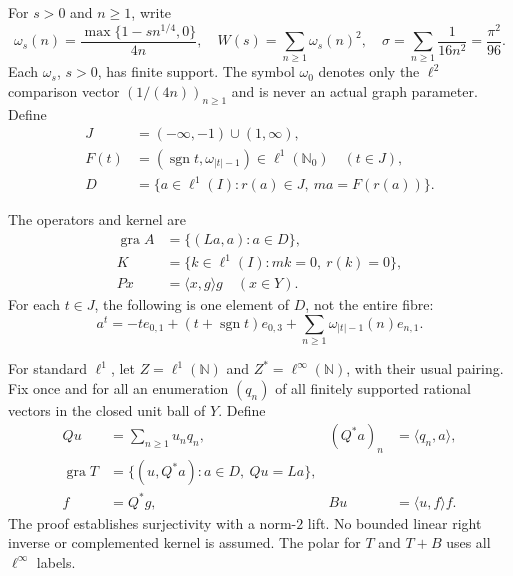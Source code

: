 \documentclass[11pt]{article}
\newcommand{\N}{\mathbb N}
\newcommand{\Nzero}{\mathbb N_0}
\newcommand{\gra}{\operatorname{gra}}
\newcommand{\sgn}{\operatorname{sgn}}
\newcommand{\pair}[2]{\langle #1,#2\rangle}
\begin{document}
For $s>0$ and $n\ge1$, write
\begin{equation}
\omega_s(n)=\frac{\max\{1-sn^{1/4},0\}}{4n},\quad
W(s)=\sum_{n\ge1}\omega_s(n)^2,\quad
\sigma=\sum_{n\ge1}\frac1{16n^2}=\frac{\pi^2}{96}.
\tag{D6}\label{eq:D6}
\end{equation}
Each $\omega_s$, $s>0$, has finite support. The symbol $\omega_0$ denotes only
the $\ell^2$ comparison vector $(1/(4n))_{n\ge1}$ and is never an actual
graph parameter. Define
\begin{equation}
\begin{aligned}
J&=(-\infty,-1)\cup(1,\infty),\\
F(t)&=(\sgn t,\omega_{|t|-1})\in\ell^1(\Nzero)\quad(t\in J),\\
D&=\{a\in\ell^1(I):r(a)\in J,\ ma=F(r(a))\}.
\end{aligned}
\tag{D7}\label{eq:D7}
\end{equation}

The operators and kernel are
\begin{equation}
\begin{aligned}
\gra A&=\{(La,a):a\in D\},\\
K&=\{k\in\ell^1(I):mk=0,\ r(k)=0\},\\
Px&=\pair{x}{g}g\quad(x\in Y).
\end{aligned}
\tag{D8}\label{eq:D8}
\end{equation}
For each $t\in J$, the following is one element of $D$, not the entire fibre:
\begin{equation}
a^t=-t e_{0,1}+(t+\sgn t)e_{0,3}
       +\sum_{n\ge1}\omega_{|t|-1}(n)e_{n,1}.
\tag{D9}\label{eq:D9}
\end{equation}

\ifdefined\expandedversion
For standard $\ell^1$, let $Z=\ell^1(\N)$ and $Z^*=\ell^\infty(\N)$,
with their usual pairing. Fix once and for all an enumeration $(q_n)$ of
all finitely supported rational vectors in the closed unit ball of $Y$.
Define
\begin{equation}
\begin{aligned}
Qu&=\sum_{n\ge1}u_nq_n,& (Q^*a)_n&=\pair{q_n}{a},\\
\gra T&=\{(u,Q^*a):a\in D,\ Qu=La\},\\
f&=Q^*g,& Bu&=\pair{u}{f}f.
\end{aligned}
\tag{D10}\label{eq:D10}
\end{equation}
The proof establishes surjectivity with a norm-$2$ lift. No bounded linear
right inverse or complemented kernel is assumed. The polar for $T$ and
$T+B$ uses all $\ell^\infty$ labels.
\fi
\end{document}
